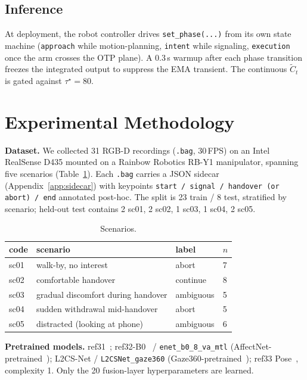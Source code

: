 \documentclass{article}
\newcommand{\code}[1]{\texttt{\small #1}}
\begin{document}
\subsection{Inference}

At deployment, the robot controller drives \code{set\_phase(...)} from its own state machine (\code{approach} while motion-planning, \code{intent} while signaling, \code{execution} once the arm crosses the OTP plane). A 0.3\,s warmup after each phase transition freezes the integrated output to suppress the EMA transient. The continuous $\tilde{C}_t$ is gated against $\tau^\star = 80$.

\section{Experimental Methodology}

\textbf{Dataset.} We collected 31 RGB-D recordings (\code{.bag}, 30\,FPS) on an Intel RealSense D435 mounted on a Rainbow Robotics RB-Y1 manipulator, spanning five scenarios (Table~\ref{tab:scen}). Each \code{.bag} carries a JSON sidecar (Appendix~\ref{app:sidecar}) with keypoints \code{start / signal / handover (or abort) / end} annotated post-hoc. The split is 23 train / 8 test, stratified by scenario; held-out test contains 2 sc01, 2 sc02, 1 sc03, 1 sc04, 2 sc05.

\begin{table}[h]
\centering
\caption{Scenarios.}
\label{tab:scen}
\small
\begin{tabular}{@{}llll@{}}
\toprule
code & scenario & label & $n$ \\
\midrule
sc01 & walk-by, no interest & abort & 7 \\
sc02 & comfortable handover & continue & 8 \\
sc03 & gradual discomfort during handover & ambiguous & 5 \\
sc04 & sudden withdrawal mid-handover & abort & 5 \\
sc05 & distracted (looking at phone) & ambiguous & 6 \\
\bottomrule
\end{tabular}
\end{table}

\textbf{Pretrained models.} ref31~\cite{ref31}; ref32-B0~\cite{ref32} / \code{enet\_b0\_8\_va\_mtl} (AffectNet-pretrained~\cite{ref26}); L2CS-Net / \code{L2CSNet\_gaze360} (Gaze360-pretrained~\cite{ref25}); ref33 Pose~\cite{ref33}, complexity 1. Only the 20 fusion-layer hyperparameters are learned.
\end{document}

